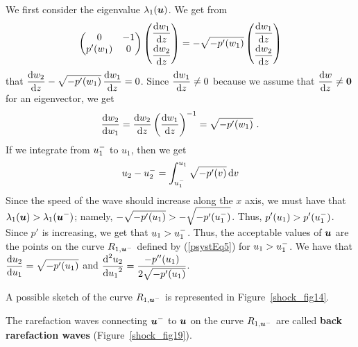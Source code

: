 \begin{egg}
We first consider the eigenvalue $\lambda_1({\bm{u}})$.  We get from
\[
\begin{pmatrix} 0 & -1 \\ p'(w_1) & 0 \end{pmatrix}
\begin{pmatrix} \displaystyle \frac{\mathrm{d}w_1}{\mathrm{d}{z}} \\[0.6em]
\displaystyle \frac{\mathrm{d}w_2}{\mathrm{d}{z}} \end{pmatrix}
= -\sqrt{-p'(w_1)} \begin{pmatrix} \displaystyle \frac{\mathrm{d}w_1}{\mathrm{d}{z}} \\[0.6em]
\displaystyle \frac{\mathrm{d}w_2}{\mathrm{d}{z}} \end{pmatrix}
\]
that
$\displaystyle \frac{\mathrm{d}w_2}{\mathrm{d}{z}} - \sqrt{-p'(w_1)} \, \frac{\mathrm{d}w_1}{\mathrm{d}{z}} = 0$.
Since $\displaystyle \frac{\mathrm{d}w_1}{\mathrm{d}{z}} \neq 0$ because we assume that
$\displaystyle \frac{\mathrm{d}w}{\mathrm{d}{z}} \neq {\bm{0}}$ for an eigenvector, we get
\[
\frac{\mathrm{d}w_2}{\mathrm{d}{w_1}} = \frac{\mathrm{d}w_2}{\mathrm{d}{z}} \left(  \frac{\mathrm{d}w_1}{\mathrm{d}{z}} \right)^{-1}
= \sqrt{-p'(w_1)} \ .
\]
If we integrate from $\displaystyle u_1^-$ to $u_1$, then we get
\begin{equation} \label{psystEq5}
u_2 - u_2^- = \int_{u_1^-}^{u_1} \sqrt{-p'(v)} \,\mathrm{d}{v}
\end{equation}
Since the speed of the wave should increase along the $x$ axis, we
must have that
$\displaystyle \lambda_1({\bm{u}}) > \lambda_1({\bm{u}}^-)$; namely,
$\displaystyle -\sqrt{-p'(u_1)} > -\sqrt{-p'(u_1^-)}$.  Thus,
$\displaystyle p'(u_1) > p'(u_1^-)$.  Since $p'$ is increasing, we get that
$\displaystyle u_1 > u_1^-$.
Thus, the acceptable values of ${\bm{u}}$ are the points on the curve
$R_{1,{\bm{u}}^-}$ defined by (\ref{psystEq5}) for
$\displaystyle u_1 > u_1^-$.  We have that
$\displaystyle \frac{\mathrm{d}u_2}{\mathrm{d}{u_1}} = \sqrt{-p'(u_1)}$ and
$\displaystyle \frac{\displaystyle \mathrm{d}^{2}{u_2}} {\displaystyle \mathrm{d}{u_1}^{2}} = \frac{-p''(u_1)}{2\sqrt{-p'(u_1)}}$.

A possible sketch of the curve $R_{1,{\bm{u}}^-}$ is represented in
Figure~\ref{shock_fig14}.

The rarefaction waves connecting $\displaystyle {\bm{u}}^-$ to
${\bm{u}}$ on the curve $R_{1,{\bm{u}}^-}$ are called {\bfseries back rarefaction
waves}
(Figure~\ref{shock_fig19}).



\end{egg}
